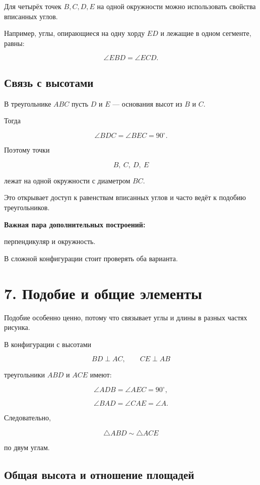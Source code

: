 \documentclass[a4paper,12pt]{article}
\newcommand{\important}[1]{%
  \textbf{\color{darkaccent}#1}%
}
\begin{document}
Для четырёх точек $B,C,D,E$ на одной окружности
можно использовать свойства вписанных углов.

Например, углы, опирающиеся на одну хорду $ED$
и лежащие в одном сегменте, равны:

\[
\boxed{\angle EBD=\angle ECD}.
\]

\subsection{Связь с высотами}

В треугольнике $ABC$ пусть $D$ и $E$
--- основания высот из $B$ и $C$.

Тогда

\[
\angle BDC
=
\angle BEC
=
90^\circ.
\]

Поэтому точки

\[
B,\ C,\ D,\ E
\]

лежат на одной окружности
с диаметром $BC$.

Это открывает доступ к равенствам вписанных углов
и часто ведёт к подобию треугольников.

\important{Важная пара дополнительных построений:}
перпендикуляр и окружность.

В сложной конфигурации стоит проверять оба варианта.


\clearpage
\section{7. Подобие и общие элементы}

Подобие особенно ценно,
потому что связывает углы и длины
в разных частях рисунка.

В конфигурации с высотами

\[
BD\perp AC,
\qquad
CE\perp AB
\]

треугольники $ABD$ и $ACE$ имеют:

\[
\angle ADB
=
\angle AEC
=
90^\circ,
\]

\[
\angle BAD
=
\angle CAE
=
\angle A.
\]

Следовательно,

\[
\boxed{\triangle ABD\sim\triangle ACE}
\]

по двум углам.

\subsection{Общая высота и отношение площадей}
\end{document}
